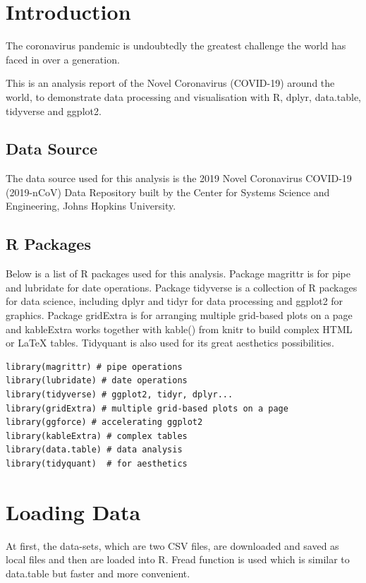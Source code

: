 \section{Introduction}

The coronavirus pandemic is undoubtedly the greatest challenge the world has faced in over a generation.

This is an analysis report of the Novel Coronavirus (COVID-19) around the world, to demonstrate data processing and visualisation with R, dplyr, data.table, tidyverse and ggplot2.

\subsection{Data Source}

The data source used for this analysis is the 2019 Novel Coronavirus COVID-19 (2019-nCoV) Data Repository
built by the Center for Systems Science and Engineering, Johns Hopkins University.

\subsection{R Packages}

Below is a list of R packages used for this analysis. Package magrittr is for pipe
and lubridate for date operations. Package tidyverse is a collection of R packages for data science, including
dplyr and tidyr for data processing and ggplot2 for graphics. Package gridExtra is for arranging multiple
grid-based plots on a page and kableExtra works together with kable() from knitr to build complex HTML
or LaTeX tables. Tidyquant is also used for its great aesthetics possibilities.

\begin{verbatim}
library(magrittr) # pipe operations
library(lubridate) # date operations
library(tidyverse) # ggplot2, tidyr, dplyr...
library(gridExtra) # multiple grid-based plots on a page
library(ggforce) # accelerating ggplot2
library(kableExtra) # complex tables
library(data.table) # data analysis
library(tidyquant)  # for aesthetics
\end{verbatim}

\section{Loading Data}
At first, the data-sets, which are two CSV files, are downloaded and saved as local files and then are loaded into R. Fread function is used which is similar to data.table but faster and more convenient.

